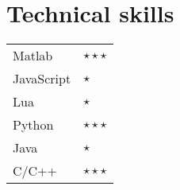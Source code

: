 \documentclass[11pt,a4paper,sans]{moderncv}
\begin{document}
\section{Technical skills} %

\cvitem{}
{
\hspace{10mm}\begin{tabular}{p{5cm}l}
Matlab & $\star\star\star$\\
JavaScript & $\star$ \\
Lua & $\star$ \\
Python & $\star\star\star$ \\
Java & $\star$ \\
C/C++ & $\star\star\star$ \\
\end{tabular}
\linebreak
}
\end{document}

